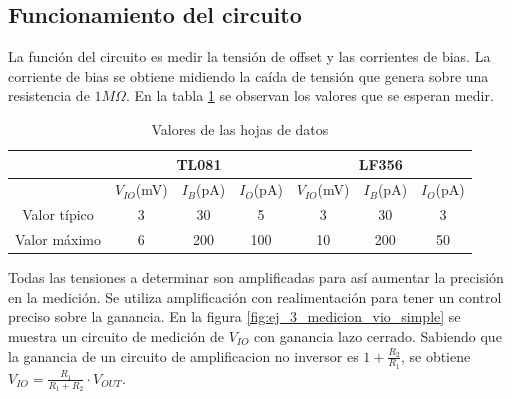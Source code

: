\documentclass[../../main.tex]{subfiles}
\begin{document}
\subsection{Funcionamiento del circuito}
La funci\'on del circuito es medir la tensi\'on de offset y las corrientes de bias. La corriente de bias se obtiene midiendo la ca\'ida de tensi\'on que genera sobre una resistencia de $1M\Omega$. En la tabla \ref{tab:ej_3_datasheet} se observan los valores que se esperan medir.


\begin{table}[htbp]
\centering
\begin{tabular}{ccccccc}
               & \multicolumn{3}{c}{TL081}            & \multicolumn{3}{c}{LF356}    \\
\hline              
               & $V_{IO}$(mV) & $I_B$(pA) & $I_O$(pA) & $V_{IO}$(mV) & $I_B$(pA) & $I_O$(pA) \\
\hline
Valor t\'ipico & 3            & 30        & 5         & 3            & 30    & 3     \\
Valor m\'aximo & 6            & 200       & 100       & 10           & 200   & 50   
\end{tabular}
\caption{Valores de las hojas de datos}
\label{tab:ej_3_datasheet}
\end{table}

Todas las tensiones a determinar son amplificadas para as\'i aumentar la precisi\'on en la medici\'on. Se utiliza amplificaci\'on con realimentaci\'on para tener un control preciso sobre la ganancia. En la figura \ref{fig:ej_3_medicion_vio_simple} se muestra un circuito de medici\'on de $V_{IO}$ con ganancia lazo cerrado. Sabiendo que la ganancia de un circuito de amplificacion no inversor es $1+\frac{R_2}{R_1}$, se obtiene $V_{IO}=\frac{R_1}{R_1+R_2}\cdot V_{OUT}$. 
\end{document}
